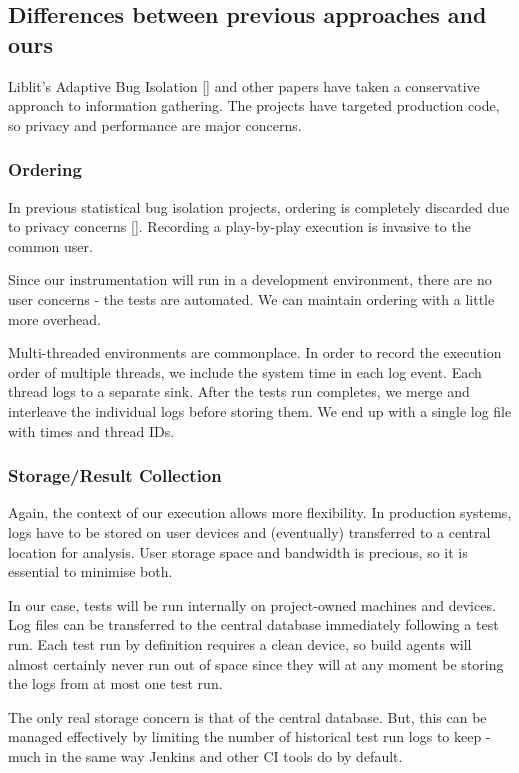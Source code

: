 \subsection{Differences between previous approaches and ours}

Liblit’s Adaptive Bug Isolation [] and other papers have taken a conservative approach to information gathering. The projects have targeted production code, so privacy and performance are major concerns.



\subsubsection{Ordering}

In previous statistical bug isolation projects, ordering is completely discarded due to privacy concerns []. Recording a play-by-play execution is invasive to the common user.

Since our instrumentation will run in a development environment, there are no user concerns - the tests are automated. We can maintain ordering with a little more overhead.

Multi-threaded environments are commonplace. In order to record the execution order of multiple threads, we include the system time in each log event. Each thread logs to a separate sink. After the tests run completes, we merge and interleave the individual logs before storing them. We end up with a single log file with times and thread IDs.


\subsubsection{Storage/Result Collection}

Again, the context of our execution allows more flexibility. In production systems, logs have to be stored on user devices and (eventually) transferred to a central location for analysis. User storage space and bandwidth is precious, so it is essential to minimise both.

In our case, tests will be run internally on project-owned machines and devices. Log files can be transferred to the central database immediately following a test run. Each test run by definition requires a clean device, so build agents will almost certainly never run out of space since they will at any moment be storing the logs from at most one test run.

The only real storage concern is that of the central database. But, this can be managed effectively by limiting the number of historical test run logs to keep - much in the same way Jenkins and other CI tools do by default.


